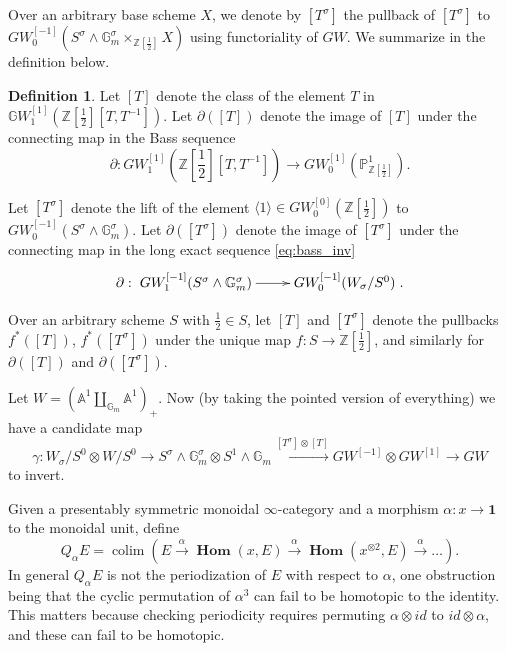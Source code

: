 \documentclass[edeposit,fullpage]{uiucthesis2009}
\newcommand{\Z}{\mathbb Z}
\newcommand{\mbb}{\mathbb}
\DeclareMathOperator*{\colim}{colim}
\DeclareMathOperator{\iHom}{\mathbf{Hom}}
\theoremstyle{plain}
\numberwithin{lemma}{section}
\theoremstyle{definition}
\newtheorem{definition}[lemma]{Definition}
\begin{document}
Over an arbitrary base scheme $X$, we denote by $[T^\sigma]$ the pullback of
$[T^\sigma]$ to $GW^{[-1]}_0(S^\sigma \wedge \mbb G_m^\sigma
\times_{\Z[\frac{1}{2}]} X)$ using functoriality of $GW$. We summarize
in the definition below.

\begin{definition}\label{def:T_Tsigma}
Let  $[T]$ denote the class of the element $T$ in $\mbb
GW_1^{[1]}(\Z[\frac{1}{2}][T,T^{-1}])$. Let $\partial([T])$ denote the
image of $[T]$ under the connecting map in the Bass sequence
\[
\partial : GW_1^{[1]}(\Z[\frac{1}{2}][T,T^{-1}]) \rightarrow
GW_0^{[1]}(\mbb P^1_{\Z[\frac{1}{2}]}).
\]

Let $[T^\sigma]$ denote the lift of the element $\langle 1 \rangle
\in GW^{[0]}_0(\Z[\frac{1}{2}])$ to $GW^{[-1]}_0(S^\sigma \wedge \mbb
G_m^\sigma)$. Let $\partial([T^\sigma])$ denote the image of
$[T^\sigma]$ under the connecting map in the long exact sequence
\ref{eq:bass_inv}
\[
\partial : \xymatrix{GW_1^{[-1]}(S^\sigma \wedge \mbb G_m^\sigma) \ar[r] &
  GW_0^{[-1]}(W_\sigma/S^0)}.
\]

Over an arbitrary scheme $S$ with $\frac{1}{2} \in S$, let $[T]$ and
$[T^\sigma]$ denote the pullbacks $f^*([T])$, $f^*([T^\sigma])$ under
the unique map $f : S \rightarrow \mbb Z[\frac{1}{2}]$, and similarly
for $\partial([T])$ and $\partial([T^\sigma])$.
\end{definition}

Let $W = (\mbb A^1 \coprod_{\mbb G_m} \mbb A^1)_+$. Now (by taking the pointed version of everything) we have a candidate map
\begin{equation}\label{eq:gamma}
\gamma : W_\sigma/S^0 \otimes W/S^0 \rightarrow
S^\sigma \wedge \mbb G_m^\sigma \otimes S^1 \wedge \mbb G_m
\xrightarrow{[T^\sigma] \otimes [T]}
GW^{[-1]} \otimes GW^{[1]} \rightarrow GW
\end{equation}
to invert. 


Given a presentably symmetric monoidal $\infty$-category and a
morphism $\alpha : x \rightarrow \mathbf{1}$ to the monoidal unit,
define 
\[
Q_\alpha E = \colim(E \xrightarrow{\alpha} \iHom(x,E)
\xrightarrow{\alpha} \iHom(x^{\otimes 2}, E) \xrightarrow{\alpha}
\dots ).
\]
In general $Q_\alpha E$ is not the periodization of $E$ with respect
to $\alpha$, one obstruction being that the cyclic permutation of
$\alpha^3$ can fail to be homotopic to the identity. This matters
because checking periodicity requires permuting $\alpha \otimes id$ to $id \otimes \alpha$, and these
can fail to be homotopic. 
\end{document}
